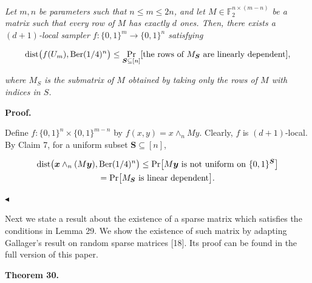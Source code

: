 \documentclass[10pt,a4paper]{article}
\begin{document}
\emph{Let $m,n$ be parameters such that $n\leq m\leq 2n$, and let $M\in\mathbb{F}_{2}^{n\times(m-n)}$ be a matrix such that every row of $M$ has exactly $d$ ones.
Then, there exists a $(d+1)$-local sampler $f\colon\{0,1\}^{m}\to\{0,1\}^{n}$ satisfying}\par


\[\begin{gathered}
\displaystyle\mathrm{dist}\bigl(f(U_{m}),\textnormal{Ber}(1/4)^{n}\bigr)\leq\Pr_{\boldsymbol{S}\subseteq[n]}[\text{the rows of $M_{\boldsymbol{S}}$ are linearly dependent}],
\end{gathered}\]


\emph{where $M_{S}$ is the submatrix of $M$ obtained by taking only the rows of $M$ with indices in $S$.}\par






\par\medskip\noindent\textbf{Proof.}\par




Define $f\colon\{0,1\}^{n}\times\{0,1\}^{m-n}$ by $f(x,y)=x\wedge_{n}My$.
Clearly, $f$ is $(d+1)$-local.
By Claim 7, for a uniform subset $\boldsymbol{S}\subseteq[n]$,\par


\[\begin{gathered}
\displaystyle\mathrm{dist}\bigl(\boldsymbol{x}\wedge_{n}(M\boldsymbol{y}),\textnormal{Ber}(1/4)^{n}\bigr) \displaystyle\leq\Pr\bigl[\text{$M\boldsymbol{y}$ is not uniform on $\{0,1\}^{\boldsymbol{S}}$}\bigr] \\
\displaystyle=\Pr\bigl[\text{$M_{\boldsymbol{S}}$ is linear dependent}\bigr].
\end{gathered}\]


$\blacktriangleleft$\par




Next we state a result about the existence of a sparse matrix which satisfies the conditions in Lemma 29.
We show the existence of such matrix by adapting Gallager’s result on random sparse matrices [18].
Its proof can be found in the full version of this paper.\par





\par\medskip\noindent\textbf{
\textbf{Theorem 30}\textbf{.}
}\par
\end{document}
